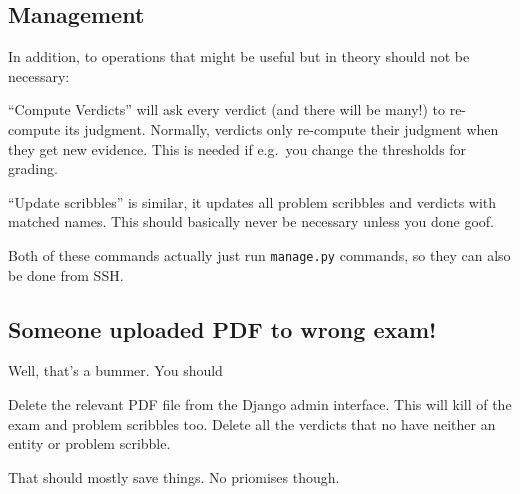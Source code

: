 \subsection{Management}
In addition, to operations that might be useful
but in theory should not be necessary:
\begin{itemize}
	\ii ``Compute Verdicts'' will ask every verdict (and there will be many!)
	to re-compute its judgment.
	Normally, verdicts only re-compute their judgment when they get new evidence.
	This is needed if e.g.\ you change the thresholds for grading.

	\ii ``Update scribbles'' is similar,
	it updates all problem scribbles and verdicts
	with matched names.
	This should basically never be necessary unless you done goof.
\end{itemize}
Both of these commands actually just run \verb+manage.py+ commands,
so they can also be done from SSH.

\subsection{Someone uploaded PDF to wrong exam!}
Well, that's a bummer.  You should
\begin{itemize}
	\ii Delete the relevant PDF file from the Django admin interface.
	This will kill of the exam and problem scribbles too.
	\ii Delete all the verdicts that no have neither an entity or problem scribble.
\end{itemize}
That should mostly save things. No priomises though.
